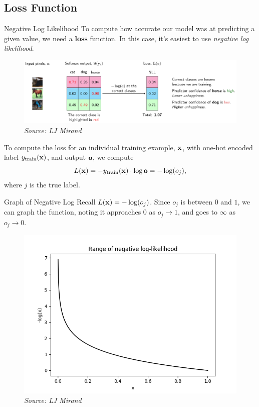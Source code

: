 \documentclass[xcolor=dvipsnames, fontsize=11pt, %
pagesize, %
parskip=half-, t]{beamer}
\begin{document}
 \subsection{Loss Function}
 \begin{frame}{Negative Log Likelihood}
 To compute how accurate our model was at predicting a given value, we need a \textbf{loss} function. In this case, it's easiest to use \textit{negative log likelihood}.  
 \begin{figure}[H] \center \includegraphics[scale=0.15]{neg_log_demo.png}
 \caption{\textit{Source: LJ Mirand}} \end{figure}  
To compute the loss for an individual training example, $\bold{x}$, with one-hot encoded label $y_{\text{train}}(\bold{x})$, and output $\bold{o}$, we compute $$L(\bold{x})=-y_{\text{train}}(\bold{x})\cdot \log \bold{o}=-\log(o_j),$$ where $j$ is the true label.
 \end{frame}
 \begin{frame}{Graph of Negative Log}
Recall $L(\bold{x})=-\log(o_j)$. Since $o_j$ is between $0$ and $1$, we can graph the function, noting it approaches $0$ as $o_j\to 1$, and goes to $\infty$ as $o_j\to 0$.
\begin{figure}[H] \center \includegraphics[scale=0.45]{neg_log.png}
\caption{\textit{Source:  LJ Mirand}}\end{figure}
 \end{frame}
\end{document}
